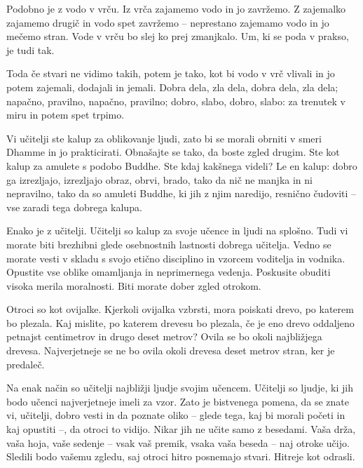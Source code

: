 Podobno je z vodo v vrču. Iz vrča zajamemo vodo in jo zavržemo. Z zajemalko zajamemo drugič in vodo spet zavržemo – neprestano zajemamo vodo in jo mečemo stran. Vode v vrču bo slej ko prej zmanjkalo. Um, ki se poda v prakso, je tudi tak.

Toda če stvari ne vidimo takih, potem je tako, kot bi vodo v vrč vlivali in jo potem zajemali, dodajali in jemali. Dobra dela, zla dela, dobra dela, zla dela; napačno, pravilno, napačno, pravilno; dobro, slabo, dobro, slabo: za trenutek v miru in potem spet trpimo.

\clearpage


Vi učitelji ste kalup za oblikovanje ljudi, zato bi se morali obrniti v smeri Dhamme in jo prakticirati. Obnašajte se tako, da boste zgled drugim. Ste kot kalup za amulete s podobo Buddhe. Ste kdaj kakšnega videli? Le en kalup: dobro ga izrezljajo, izrezljajo obraz, obrvi, brado, tako da nič ne manjka in ni nepravilno, tako da so amuleti Buddhe, ki jih z njim naredijo, resnično čudoviti – vse zaradi tega dobrega kalupa.

Enako je z učitelji. Učitelji so kalup za svoje učence in ljudi na splošno. Tudi vi morate biti brezhibni glede osebnostnih lastnosti dobrega učitelja. Vedno se morate vesti v skladu s svojo etično disciplino in vzorcem voditelja in vodnika. Opustite vse oblike omamljanja in neprimernega vedenja. Poskusite obuditi visoka merila moralnosti. Biti morate dober zgled otrokom.

\clearpage


Otroci so kot ovijalke. Kjerkoli ovijalka vzbrsti, mora poiskati drevo, po katerem bo plezala. Kaj mislite, po katerem drevesu bo plezala, če je eno drevo oddaljeno petnajst centimetrov in drugo deset metrov? Ovila se bo okoli najbližjega drevesa. Najverjetneje se ne bo ovila okoli drevesa deset metrov stran, ker je predaleč.

Na enak način so učitelji najbližji ljudje svojim učencem. Učitelji so ljudje, ki jih bodo učenci najverjetneje imeli za vzor. Zato je bistvenega pomena, da se znate vi, učitelji, dobro vesti in da poznate oliko – glede tega, kaj bi morali početi in kaj opustiti –, da otroci to vidijo. Nikar jih ne učite samo z besedami. Vaša drža, vaša hoja, vaše sedenje – vsak vaš premik, vsaka vaša beseda – naj otroke učijo. Sledili bodo vašemu zgledu, saj otroci hitro posnemajo stvari. Hitreje kot odrasli.

\clearpage

